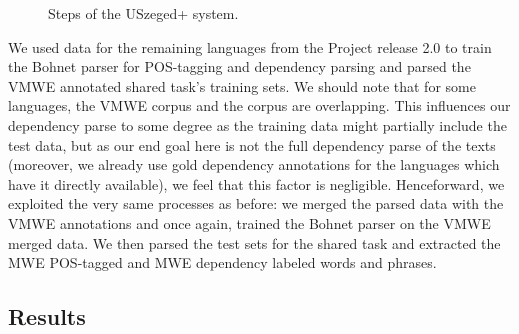 \documentclass[output=paper,
modfonts,
]{langscibook}
\begin{document}
\begin{figure}
\vspace{2em}
\caption{Steps of the USzeged+ system.}
\label{szeged+}
\end{figure}

We used data for the remaining languages from the  Project release 2.0 \citep{univdep} 
to train the Bohnet parser for POS-tagging and dependency parsing and parsed the VMWE annotated shared task's training sets.
We should note that for some languages, the VMWE corpus and the  corpus are overlapping. This influences our dependency parse to some degree as the training data might partially include the test data, but as our end goal here is not the full dependency parse of the texts (moreover, we already use gold dependency annotations for the languages which have it directly available), we feel that this factor is negligible. Henceforward, we exploited the very same processes as before: we merged the parsed data with the VMWE annotations and once again, trained the Bohnet parser on the VMWE merged data. We then parsed the test sets for the shared task and extracted the MWE POS-tagged and MWE dependency labeled words and phrases. 

\subsection{Results}
\end{document}
